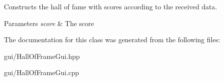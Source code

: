 Constructs the hall of fame with scores according to the received data. 


\begin{DoxyParams}{Parameters}
{\em score} & The score \\
\hline
\end{DoxyParams}


The documentation for this class was generated from the following files\+:\begin{DoxyCompactItemize}
\item 
gui/Hall\+Of\+Frame\+Gui.\+hpp\item 
gui/Hall\+Of\+Frame\+Gui.\+cpp\end{DoxyCompactItemize}
